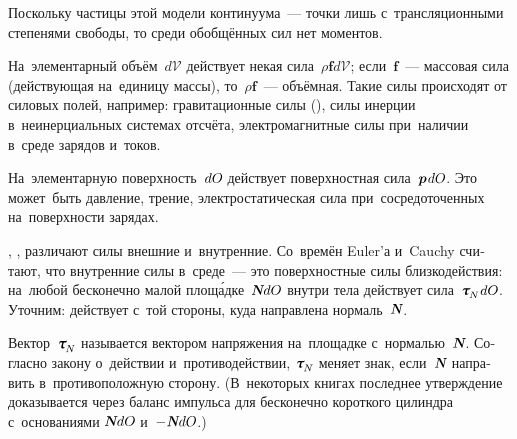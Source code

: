 \begin{otherlanguage}{russian}


Поскольку частицы этой модели континуума~--- точки лишь с~трансляционными степенями свободы, то среди обобщённых сил нет моментов.


На~элементарный объём~$d\mathcal{V}$ действует некая сила~${\rho \bm{f} d\mathcal{V}}$; \hbox{если}~$\bm{f}$~--- массовая сила (действующая на~единицу массы), то~${\rho \bm{f}}$~--- объёмная. Такие силы происходят от силовых полей, например: гравитационные силы (), силы инерции в~неинерциальных системах отсчёта, электромагнитные силы при~наличии в~среде зарядов и~токов.

На~элементарную поверхность~${dO\hspace{-0.12ex}}$ действует поверхностная сила~${\bm{p} \hspace{0.2ex} dO\hspace{-0.12ex}}$. Это может~быть давление, трение, электростатическая сила при~сосредоточенных на~поверхности зарядах.

, , различают силы внешние и~внутренние. Со~времён Euler’а и~Cauchy считают, что внутренние силы в~среде~--- это поверхностные силы близкодействия: на~любой бесконечно малой площ\'{а}дке~${\mathboldN dO\hspace{-0.12ex}}$ внутри тела действует сила~${\cauchystress_{\hspace{-0.2ex}\raisemath{-0.1em}{N}\hspace{0.1ex}} dO\hspace{-0.12ex}}$. Уточним: действует с~той стороны, куда направлена нормаль~$\mathboldN$.

Вектор~${\cauchystress_{\hspace{-0.2ex}\raisemath{-0.1em}{N}}\hspace{-0.1ex}}$ называется вектором напряжения на~площадке с~нормалью~$\mathboldN$. Согласно закону о~действии и~противодействии, ${\cauchystress_{\hspace{-0.2ex}\raisemath{-0.1em}{N}}\hspace{-0.1ex}}$ меняет знак, если~$\mathboldN$ направить в~противоположную сторону.
(В~некоторых книгах последнее утверждение доказывается через баланс импульса для бесконечно короткого цилиндра с~основаниями ${\mathboldN dO\hspace{-0.12ex}}$ и~${- \hspace{0.1ex} \mathboldN dO\hspace{-0.12ex}}$.)


\end{otherlanguage}
